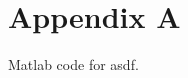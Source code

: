 \documentclass[a4paper]{article}
\begin{document}



\clearpage
\appendix

\clearpage
\section*{Appendix A}\label{code:asdf}

Matlab code for asdf.

%
\end{document}
